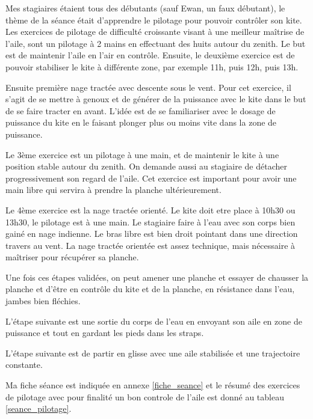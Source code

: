 \documentclass[11pt,a4paper]{report}
\begin{document}
Mes stagiaires étaient tous des débutants (sauf Ewan, un faux débutant), 
le thème de la séance était d'apprendre le pilotage pour pouvoir contrôler son kite.
Les exercices de pilotage de difficulté croissante visant à une
meilleur maîtrise de l'aile, sont un pilotage à 2 mains en effectuant des huits
autour du zenith. Le but est de maintenir l'aile en l'air en contrôle.
Ensuite, le deuxième exercice est de pouvoir stabiliser le kite à différente 
zone, par exemple 11h, puis 12h, puis 13h.

Ensuite première nage tractée avec descente sous 
le vent. Pour cet exercice, il s'agit de se mettre à genoux
et de générer de la puissance avec le kite dans le but
de se faire tracter en avant.  L'idée est de se familiariser
avec le dosage de puissance du kite en le faisant plonger
plus ou moins vite dans la zone de puissance.

Le 3ème exercice est un pilotage à une main, et 
de maintenir le kite à une position stable autour
du zenith. On demande aussi au stagiaire de
détacher progressivement son regard de l'aile.
Cet exercice est important pour avoir une main libre
qui servira à prendre la planche ultérieurement.

Le 4ème exercice est la nage tractée orienté.
Le kite doit etre place à 10h30 ou 13h30, le pilotage
est à une main. Le stagiaire faire  à l'eau
avec son corps bien gainé en nage indienne. Le bras
libre est bien droit pointant dans une direction 
travers au vent. La nage tractée orientée est assez
technique, mais nécessaire à maîtriser pour récupérer 
sa planche.

Une fois ces étapes validées, on peut
amener une planche et essayer de chausser la planche
et d’être en contrôle du kite et de la planche, 
en résistance dans l'eau, jambes bien fléchies.

L'étape suivante est une sortie du corps de l'eau
en envoyant son aile en zone de puissance et tout en 
gardant les pieds dans les straps. 

L'étape suivante est de partir en glisse avec
une aile stabilisée et une trajectoire constante.

Ma fiche séance est indiquée en annexe \ref{fiche_seance}
et le résumé des exercices de pilotage avec pour
finalité un bon controle de l'aile est donné
au tableau \ref{seance_pilotage}.
\end{document}

